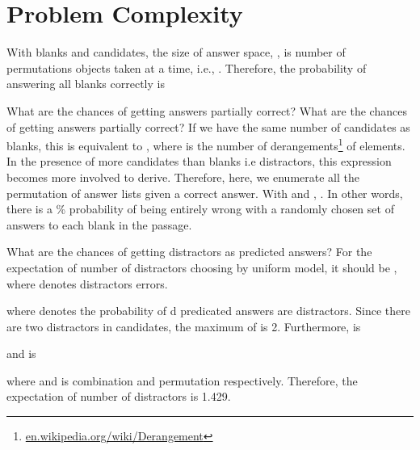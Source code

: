 \documentclass[11pt,a4paper]{article}
\begin{document}
\section{Problem Complexity}
With  blanks and  candidates, the size of answer space, , is number of permutations  objects taken  at a time, i.e., . Therefore, the probability of answering all blanks correctly is 

What are the chances of getting answers partially correct? What are the chances of getting answers partially correct? If we have the same number of candidates as blanks, this is equivalent to , where  is the number of derangements\footnote{\url{en.wikipedia.org/wiki/Derangement}} of  elements. In the presence of more candidates than blanks i.e distractors, this expression becomes more involved to derive. Therefore, here, we enumerate all the permutation of answer lists given a correct answer. With  and , . In other words, there is a \% probability of being entirely wrong with a randomly chosen set of answers to each blank in the passage.

What are the chances of getting distractors as predicted answers? For the expectation of number of distractors choosing by uniform model, it should be , where  denotes distractors errors.

where  denotes the probability of d predicated answers are distractors. Since there are two distractors in candidates, the maximum of  is 2.
Furthermore,  is 

and  is

where  and  is combination and permutation respectively. Therefore, the expectation of number of distractors is 1.429.
\end{document}
